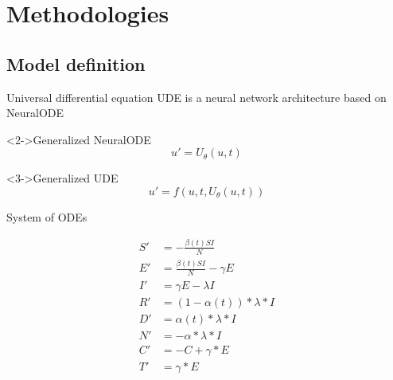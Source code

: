 \section{Methodologies}

\subsection{Model definition}

\begin{frame}{Universal differential equation}
    \gls{UDE} \cite{rackauckasUniversalDifferentialEquations2020} is a neural network architecture based on \gls{NeuralODE} \cite{chenNeuralOrdinaryDifferential2019}
    \begin{block}<2->{Generalized \gls{NeuralODE}}
        \begin{equation*}
            u' = U_\theta(u, t)
        \end{equation*}
    \end{block}
    \begin{block}<3->{Generalized \gls{UDE}}
        \begin{equation*}
            u' = f(u, t, U_\theta(u, t))
        \end{equation*}
    \end{block}
\end{frame}

\begin{frame}{System of \glspl{ODE}}
    \begin{definition}
        \begin{equation*}
            \begin{aligned}
                S' &= - \frac{\beta(t) SI}{N} \\
                E' &= \frac{\beta(t) SI}{N} - \gamma E \\
                I' &= \gamma E - \lambda I \\
                R' &= (1 - \alpha(t)) * \lambda * I \\
                D' &= \alpha(t) * \lambda * I \\
                N' &= - \alpha * \lambda * I \\
                C' &= -C + \gamma * E \\
                T' &= \gamma * E \\
            \end{aligned}
        \end{equation*}
    \end{definition}
\end{frame}

